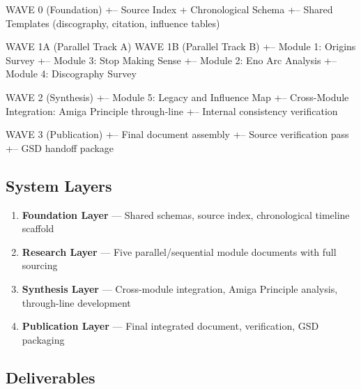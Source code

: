 \documentclass[11pt,letterpaper]{article}
\begin{document}
\begin{asciibox}
  WAVE 0 (Foundation)
  +-- Source Index + Chronological Schema
  +-- Shared Templates (discography, citation, influence tables)

  WAVE 1A (Parallel Track A)               WAVE 1B (Parallel Track B)
  +-- Module 1: Origins Survey             +-- Module 3: Stop Making Sense
  +-- Module 2: Eno Arc Analysis           +-- Module 4: Discography Survey

  WAVE 2 (Synthesis)
  +-- Module 5: Legacy and Influence Map
  +-- Cross-Module Integration: Amiga Principle through-line
  +-- Internal consistency verification

  WAVE 3 (Publication)
  +-- Final document assembly
  +-- Source verification pass
  +-- GSD handoff package
\end{asciibox}

\subsection{System Layers}

\begin{enumerate}
  \item \textbf{Foundation Layer} --- Shared schemas, source index, chronological timeline scaffold
  \item \textbf{Research Layer} --- Five parallel/sequential module documents with full sourcing
  \item \textbf{Synthesis Layer} --- Cross-module integration, Amiga Principle analysis, through-line development
  \item \textbf{Publication Layer} --- Final integrated document, verification, GSD packaging
\end{enumerate}

\subsection{Deliverables}
\end{document}

